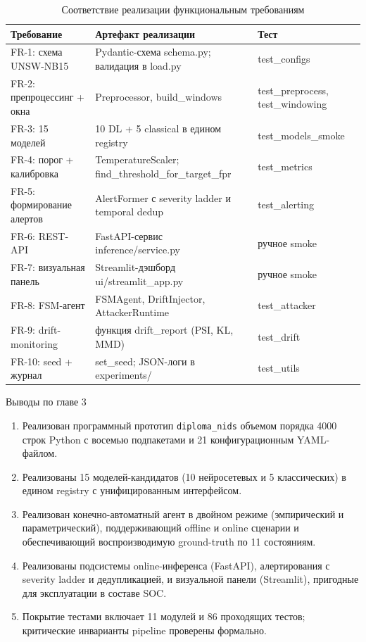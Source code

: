 \begin{table}[H]
\caption{Соответствие реализации функциональным требованиям}
\label{tab:traceability}
\centering
\footnotesize
\setlength{\tabcolsep}{4pt}
\begin{tabularx}{\linewidth}{|L{2.5cm}|Z|L{2.8cm}|}
\hline
Требование & Артефакт реализации & Тест \\
\hline
FR-1: схема UNSW-NB15      & Pydantic-схема schema.py; валидация в load.py & test\_configs \\
\hline
FR-2: препроцессинг + окна & Preprocessor, build\_windows & test\_preprocess, test\_windowing \\
\hline
FR-3: 15 моделей           & 10 DL + 5 classical в едином registry & test\_models\_smoke \\
\hline
FR-4: порог + калибровка   & TemperatureScaler; find\_threshold\_for\_target\_fpr & test\_metrics \\
\hline
FR-5: формирование алертов & AlertFormer с severity ladder и temporal dedup & test\_alerting \\
\hline
FR-6: REST-API             & FastAPI-сервис inference/service.py & ручное smoke \\
\hline
FR-7: визуальная панель    & Streamlit-дэшборд ui/streamlit\_app.py & ручное smoke \\
\hline
FR-8: FSM-агент            & FSMAgent, DriftInjector, AttackerRuntime & test\_attacker \\
\hline
FR-9: drift-monitoring     & функция drift\_report (PSI, KL, MMD) & test\_drift \\
\hline
FR-10: seed + журнал       & set\_seed; JSON-логи в experiments/ & test\_utils \\
\hline
\end{tabularx}
\end{table}

\noindent Выводы по главе 3

\begin{enumerate}
    \item Реализован программный прототип \texttt{diploma\_nids}
    объемом порядка 4000 строк Python с восемью подпакетами и
    21 конфигурационным YAML-файлом.
    \item Реализованы 15 моделей-кандидатов (10 нейросетевых и 5
    классических) в едином registry с унифицированным интерфейсом.
    \item Реализован конечно-автоматный агент в двойном режиме
    (эмпирический и параметрический), поддерживающий offline и
    online сценарии и обеспечивающий воспроизводимую ground-truth
    по 11 состояниям.
    \item Реализованы подсистемы online-инференса (FastAPI),
    алертирования с severity ladder и дедупликацией, и визуальной
    панели (Streamlit), пригодные для эксплуатации в составе SOC.
    \item Покрытие тестами включает 11 модулей и 86 проходящих
    тестов; критические инварианты pipeline проверены формально.
\end{enumerate}

